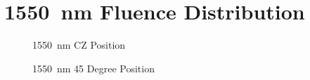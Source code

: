 \documentclass[journal,twoside,web]{ieeecolor}
\begin{document}
\section{1550~nm Fluence Distribution}
\label{app:1550Simulations}
\begin{figure}[htb!]
    \caption{\label{fig:1550-CZ} 1550~nm CZ Position}
\end{figure}

\begin{figure}[htb!]
    \caption{\label{fig:1550-45} 1550~nm 45 Degree Position}
\end{figure}
\end{document}
